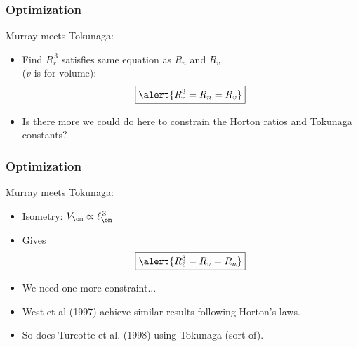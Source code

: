 \begin{frame}
  \frametitle{Optimization}

  \begin{block}{Murray meets Tokunaga:}
    \begin{itemize}
    \item<1-> 
      Find $R_r^{\, 3}$ satisfies same equation as $R_n$ and $R_v$\\
      ($v$ is for volume):
      $$
      \boxed{ \alert{R_r^3 = R_n = R_v} }
      $$
    \item<2->
      Is there more we could do here to constrain the Horton
      ratios and Tokunaga constants?
    \end{itemize}
  \end{block}

\end{frame}


\begin{frame}
  \frametitle{Optimization}

  \begin{block}{Murray meets Tokunaga:}
    \begin{itemize}
    \item<1-> 
      Isometry: $V_\om \propto \ell_\om^{\, 3}$
    \item<2->
      Gives 
      $$\boxed{\alert{R_\ell^3 = R_v = R_n}}$$
    \item<3-> 
      We need one more constraint...
    \item<4->
      West et al (1997)\cite{west1997a} achieve similar
      results following Horton's laws.
    \item<5->
      So does Turcotte et al. (1998)\cite{turcotte1998a}
      using Tokunaga (sort of).
    \end{itemize}
  \end{block}

\end{frame}

